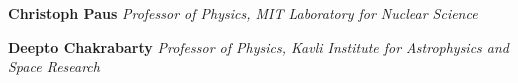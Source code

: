\vspace{8pt}

\begin{flushright}
\textbf{Christoph Paus}
\vspace{-19pt}
\vspace{-5pt}
{\itshape
Professor of Physics, MIT Laboratory for Nuclear Science
}%
\end{flushright}








\vspace{-10pt}


\begin{flushright}


\textbf{Deepto Chakrabarty}
\vspace{-19pt}
\vspace{-5pt}
{\itshape
Professor of Physics, Kavli Institute for Astrophysics and Space Research
}
\end{flushright}

